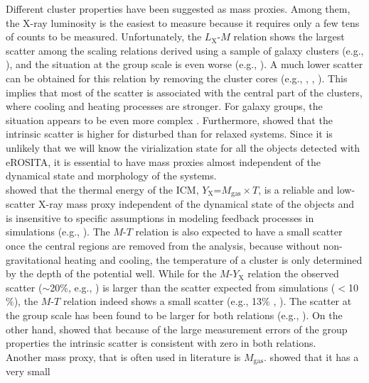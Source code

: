 \documentclass{aa} %
\begin{document}
Different cluster properties have been suggested as mass proxies. Among them, the X-ray luminosity is the easiest to measure because it requires only a few tens of 
counts to be measured. Unfortunately,
the $L_{\text{X}}$-$M$ relation shows the largest scatter among the
scaling relations derived using a sample of galaxy clusters
(e.g., \citealt{2002ApJ...567..716R}), and the situation at the group
scale is even worse (e.g., \citealt{2011A&A...535A.105E}). A much lower
scatter can be obtained for this relation by removing the cluster cores
(e.g., \citealt{1998ApJ...504...27M}, \citealt{2007ApJ...668..772M},
\citealt{2009A&A...498..361P}). This implies that most of the scatter is
associated with the central part of the clusters, where cooling and
heating processes are stronger. For galaxy groups, the situation appears to be even more complex \citep{2014arXiv1402.0868B}. Furthermore, \citet{2009A&A...498..361P} showed that the intrinsic scatter is higher for disturbed than for relaxed systems. Since it is unlikely
that we will know the virialization state for all the objects detected
with eROSITA, it is essential to have mass proxies almost
independent of the dynamical state and morphology of the systems.\\
 \citet{2006ApJ...650..128K} showed that the thermal energy of the ICM,
 $Y_{\text{X}}$=$M_{\text{gas}} \times T$, is a reliable and low-scatter
 X-ray mass proxy independent of the dynamical state of the objects and is 
 insensitive to specific assumptions in modeling feedback processes in simulations (e.g., \citealt{2010ApJ...715.1508S}).
  The $M$-$T$ relation is also expected to have a small scatter once the
 central regions are removed from the analysis, because without non-gravitational heating and cooling, the temperature of a
 cluster is only determined by the depth of the potential well.  While for the  $M$-$Y_{\text{X}}$ relation the observed scatter ($\sim$20$\%$, e.g., \citealt{2010ApJ...721..875O}) is larger  than the scatter expected from simulations ($<$10$\%$), the $M$-$T$ relation indeed shows a small scatter (e.g., 13$\%$
, \citealt{2010MNRAS.406.1773M}). 
The scatter at the group scale has been found to be larger for both relations (e.g., \citealt{2011A&A...535A.105E}). On the other hand,
\citet{2009ApJ...693.1142S} showed that because of the large measurement errors
 of the group properties the intrinsic scatter is
consistent with zero in both relations. \\
Another mass proxy, that is often used in literature is $M_{\text{gas}}$. \citet{2010ApJ...721..875O} showed that it has a very small
\end{document}

